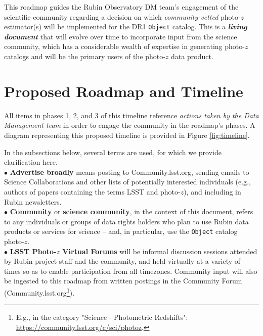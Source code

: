 \documentclass[DM,lsstdraft,toc]{lsstdoc}
\begin{document}
This roadmap guides the Rubin Observatory DM team's engagement of the scientific community regarding a decision on which \textit{community-vetted} photo-$z$ estimator(s) will be implemented for the DR1 {\tt Object} catalog.
This is a \textit{\textbf{living document}} that will evolve over time to incorporate input from the science community, which has a considerable wealth of expertise in generating photo-$z$ catalogs and will be the primary users of the photo-$z$ data product.


\clearpage
\section{Proposed Roadmap and Timeline}\label{sec:time}

All items in phases 1, 2, and 3 of this timeline reference {\it actions taken by the Data Management team} in order to engage the community in the roadmap's phases.
A diagram representing this proposed timeline is provided in Figure \ref{fig:timeline}.

In the subsections below, several terms are used, for which we provide clarification here. \\
$\bullet$ {\bf Advertise broadly} means posting to Community.lsst.org, sending emails to Science Collaborations and other lists of potentially interested individuals (e.g., authors of papers containing the terms LSST and photo-$z$), and including in Rubin newsletters. \\
$\bullet$ {\bf Community} or {\bf science community}, in the context of this document, refers to any individuals or groups of data rights holders who plan to use Rubin data products or services for science -- and, in particular, use the {\tt Object} catalog photo-$z$. \\
$\bullet$ {\bf LSST Photo-$z$ Virtual Forums} will be informal discussion sessions attended by Rubin project staff and the community, and held virtually at a variety of times so as to enable participation from all timezones. Community input will also be ingested to this roadmap from written postings in the Community Forum (Community.lsst.org\footnote{E.g., in the category "Science - Photometric Redshifts": \url{https://community.lsst.org/c/sci/photoz}.}). \\
\end{document}

